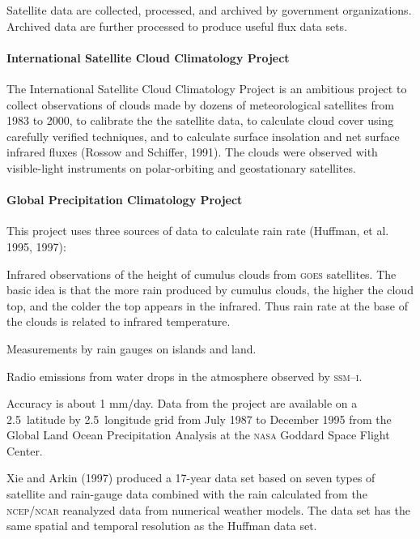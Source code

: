 Satellite data are collected, processed, and archived by government
organizations. Archived data are further processed to produce useful
flux data sets.

\paragraph{International Satellite Cloud Climatology Project}
The
International Sat\-ellite Cloud Climatology Project is an ambitious
project to collect observations of clouds made by dozens of
meteorological satellites from 1983 to 2000, to calibrate the the
satellite data, to calculate cloud cover using carefully verified
techniques, and to calculate surface
insolation and net surface infrared
fluxes (Rossow and Schiffer, 1991). The clouds were observed with
visible-light instruments on polar-orbiting and geostationary
satellites.

\paragraph{Global Precipitation Climatology Project} This project uses three sources
of data to calculate
rain rate (Huffman, et al. 1995, 1997):
\begin{enumerate}
\vitem
Infrared observations of the height of cumulus clouds from
\textsc{goes} satellites. The basic idea is that the more rain
produced by cumulus clouds, the higher the cloud top, and the colder
the top appears in the infrared. Thus rain rate at the base of the
clouds is related to infrared temperature.

\vitem
Measurements by rain gauges on islands and land.

\vitem
Radio emissions from water drops in the atmosphere observed by
\textsc{ssm--i}.
\end{enumerate}
Accuracy is about 1 mm/day. Data from the
project are available on a 2.5\degrees\ latitude by
2.5\degrees\ longitude grid from July 1987 to December 1995 from the
Global Land Ocean Precipitation Analysis at the \textsc{nasa} Goddard
Space Flight Center.

Xie and Arkin (1997) produced a 17-year data set based on seven types
of satellite and rain-gauge data combined with the rain calculated
from the \textsc{ncep/ncar} reanalyzed data from numerical weather
models. The data set has the same spatial and temporal resolution as
the Huffman data set.

